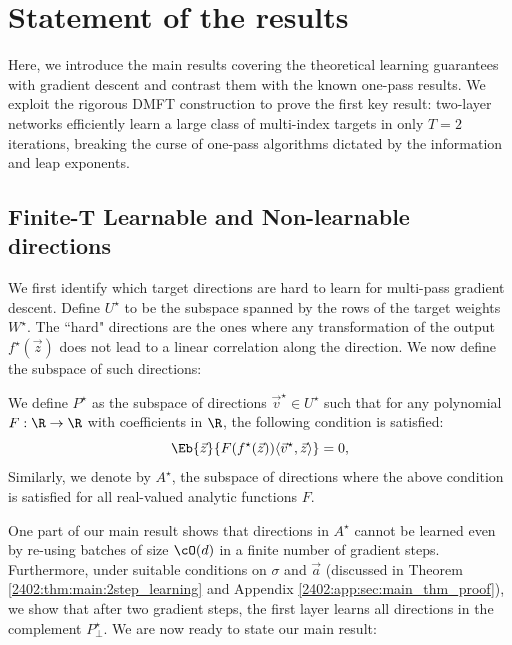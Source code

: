 \section{Statement of the results}
\label{2402:sec:main:theory_results}
Here, we introduce the main results covering the theoretical learning guarantees with gradient descent and contrast them with the known one-pass results. We exploit the rigorous DMFT construction to prove the first key result: two-layer networks efficiently learn a large class of multi-index targets in only $T = 2$ iterations, breaking the curse of one-pass algorithms dictated by the information and leap exponents. 



\subsection{Finite-T Learnable and Non-learnable directions}
We first identify which target directions are hard to learn for multi-pass gradient descent. Define $U^\star$ to be the subspace spanned by the rows of the target weights $W^\star$. The ``hard" directions are the ones where any transformation of the output $f^\star(\vec{z})$ does not lead to a linear correlation along the direction. 
We now define the subspace of such directions:


\begin{definition}\label{2402:def:two_step_hard}
    We define $P^\star$ as the subspace of directions $\vec{v}^\star\in U^\star$ such that for any polynomial $F:\R \rightarrow \R$ with coefficients in $\R$, the following condition is satisfied:
    \begin{equation}\label{2402:eq:f_hard_gen}
        \Eb{\vec{z}}{F(f^\star(\vec{z}))\langle \vec{v}^\star, \vec{z}\rangle}=0,
    \end{equation}
    Similarly, we denote by $A^\star$, the subspace of directions where the above condition is satisfied for all real-valued analytic functions $F$.
\end{definition}
One part of our main result shows that directions in $A^\star$ cannot be learned even by re-using batches of size $\cO(d)$ in a finite number of gradient steps. Furthermore, under suitable conditions on $\sigma$ and $\vec{a}$ (discussed in Theorem \ref{2402:thm:main:2step_learning} and Appendix \ref{2402:app:sec:main_thm_proof}), we show that after two gradient steps, the first layer learns all directions in the complement $P^\star_\perp$. We are now ready to state our main result: 

